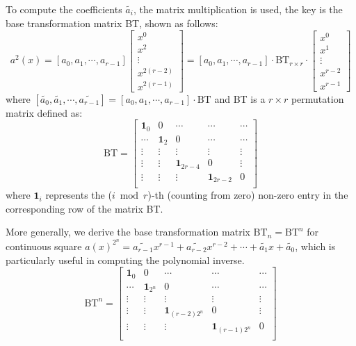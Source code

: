 \documentclass[runningheads]{llncs}
\begin{document}
To compute the coefficients $\widetilde{a_{i}}$, the matrix multiplication is used, the key is the base transformation matrix BT, shown as follows:
\[
a^2(x)= [{a_{0}},{a_{1}},\cdots,{a_{r-1}}]\left[ \begin{array}{c}
x^{0} \\
x^{2} \\
\vdots\\
x^{2(r-2)}\\
x^{2(r-1)}
\end{array}
\right ]
=
[{a_0},{a_1},\cdots,{a_{r-1}}]
\cdot \text{BT}_{r\times r} \cdot
\left[ \begin{array}{c}
x^{0} \\
x^{1} \\
\vdots\\
x^{r-2}\\
x^{r-1}
\end{array}
\right ]
\]
where $[\widetilde{a_{0}},\widetilde{a_{1}},\cdots,\widetilde{a_{r-1}}]=[{a_{0}},{a_{1}},\cdots,{a_{r-1}}]
\cdot \text{BT}$ and BT is a $r\times r$ permutation matrix defined as:
\[
\text{BT} =
\left[ \begin{array}{ccccc}
\mathbf{1}_{0}&0&\cdots&\cdots&\cdots  \\
\cdots&\mathbf{1}_{2}&0 &\cdots&\cdots \\
\vdots&\vdots&\vdots&\vdots&\vdots\\
\vdots&\vdots&\mathbf{1}_{2r-4}&0&\vdots\\
\vdots&\vdots&\vdots&\mathbf{1}_{2r-2}&0\\
\end{array}
\right ]
\]
where $\mathbf{1}_{i}$ represents the ($i\bmod r$)-th (counting from zero) non-zero entry in the corresponding row of the matrix BT.

More generally, we derive the base transformation matrix $\text{BT}_n=\text{BT}^n$ for continuous square $a(x)^{2^n}=\widetilde{a_{r-1}}x^{r-1}+\widetilde{a_{r-2}}x^{r-2}+\cdots + \widetilde{a_{1}}x +\widetilde{a_0}$, which is particularly useful in computing the polynomial inverse.
\[
\text{BT}^n =
\left[ \begin{array}{ccccc}
\mathbf{1}_{0}&0&\cdots&\cdots&\cdots  \\
\cdots&\mathbf{1}_{2^n}&0 &\cdots&\cdots \\
\vdots&\vdots&\vdots&\vdots&\vdots\\
\vdots&\vdots&\mathbf{1}_{(r-2)2^n}&0&\vdots\\
\vdots&\vdots&\vdots&\mathbf{1}_{(r-1)2^n}&0\\
\end{array}
\right ]
\]
\end{document}
